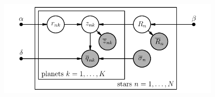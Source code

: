 \documentclass[12pt,preprint]{aastex}
\begin{document}
\begin{figure}[htbp]
\begin{center}
    \includegraphics{gm.pdf}
\end{center}
\caption{%
}
\end{figure}

\end{document}
